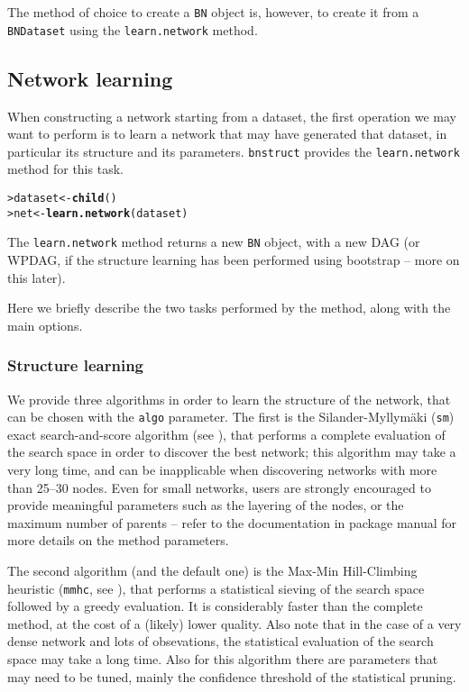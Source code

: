 \documentclass{article}\usepackage[]{graphicx}\usepackage[]{color}
\makeatletter
\newcommand{\hlstd}[1]{\textcolor[rgb]{0.345,0.345,0.345}{#1}}%
\newcommand{\hlkwb}[1]{\textcolor[rgb]{0.69,0.353,0.396}{#1}}%
\newcommand{\hlkwd}[1]{\textcolor[rgb]{0.737,0.353,0.396}{\textbf{#1}}}%
\newenvironment{kframe}{%
 \def\at@end@of@kframe{}%
 \ifinner\ifhmode%
  \def\at@end@of@kframe{\end{minipage}}%
  \begin{minipage}{\columnwidth}%
 \fi\fi%
 \def\FrameCommand##1{\hskip\@totalleftmargin \hskip-\fboxsep
 \colorbox{shadecolor}{##1}\hskip-\fboxsep
     \hskip-\linewidth \hskip-\@totalleftmargin \hskip\columnwidth}%
 \MakeFramed {\advance\hsize-\width
   \@totalleftmargin\z@ \linewidth\hsize
   \@setminipage}}%
 {\par\unskip\endMakeFramed%
 \at@end@of@kframe}
\newenvironment{knitrout}{}{} %
\newcommand{\Robject}[1]{{\texttt{#1}}}
\newcommand{\Rpackage}[1]{{\texttt{#1}}}
\newcommand{\Rmethod}[1]{{\texttt{#1}}}
\makeatother
\begin{document}
The method of choice to create a \Robject{BN} object is, however, to create it from a \Robject{BNDataset} using the
\Rmethod{learn.network} method.

\subsection{Network learning}\label{sec:networklearning}
When constructing a network starting from a dataset, the first operation we may want to perform is to learn
a network that may have generated that dataset, in particular its structure and its parameters.
\Rpackage{bnstruct} provides the \Rmethod{learn.network} method for this task.
\begin{knitrout}
\color{fgcolor}\begin{kframe}
\begin{alltt}
\hlstd{> }\hlstd{dataset} \hlkwb{<-} \hlkwd{child}\hlstd{()}
\hlstd{> }\hlstd{net}     \hlkwb{<-} \hlkwd{learn.network}\hlstd{(dataset)}
\end{alltt}
\end{kframe}
\end{knitrout}

The \Rmethod{learn.network} method returns a new \Robject{BN} object, with a new DAG (or WPDAG, if the structure
learning has been performed using bootstrap -- more on this later).

Here we briefly describe the two tasks performed by the method, along with the main options.

\subsubsection{Structure learning}
We provide three algorithms in order to learn the structure of the network, that can be chosen with the \texttt{algo} parameter.
The first is the Silander-Myllym\"aki (\texttt{sm})
exact search-and-score algorithm (see \citet*{silander2012simple}), that performs a complete evaluation of the search space in order to discover
the best network; this algorithm may take a very long time, and can be inapplicable when discovering networks
with more than 25--30 nodes. Even for small networks, users are strongly encouraged to provide
meaningful parameters such as the layering of the nodes, or the maximum number of parents -- refer to the 
documentation in package manual for more details on the method parameters.

The second algorithm (and the default one) is the Max-Min Hill-Climbing heuristic (\texttt{mmhc}, see \citet*{tsamardinos2006max}), that performs a statistical
sieving of the search space followed by a greedy evaluation. It is considerably faster than the complete method, at the cost of a (likely)
lower quality. Also note that in the case of a very dense network and lots of obsevations, the statistical evaluation
of the search space may take a long time. Also for this algorithm there are parameters that may need to be tuned,
mainly the confidence threshold of the statistical pruning.
\end{document}
